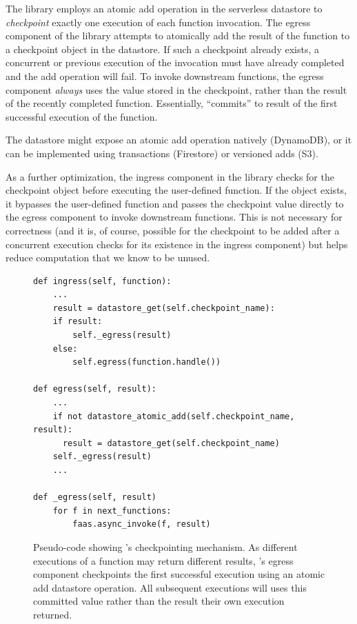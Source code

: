 The \name{} library employs an atomic add operation in the serverless datastore
to \emph{checkpoint} exactly one execution of each function invocation. The
egress component of the \name{} library attempts to atomically add the result of
the function to a checkpoint object in the datastore. If such a checkpoint
already exists, a concurrent or previous execution of the invocation must have
already completed and the add operation will fail. To invoke downstream
functions, the egress component \emph{always} uses the value stored in the
checkpoint, rather than the result of the recently completed function.
Essentially, \name{} ``commits'' to result of the first successful execution of
the function.

The datastore might expose an atomic add operation natively (DynamoDB), or it
can be implemented using transactions (Firestore) or versioned adds (S3).

As a further optimization, the ingress component in the \name{} library checks
for the checkpoint object before executing the user-defined function. If the
object exists, it bypasses the user-defined function and passes the checkpoint
value directly to the egress component to invoke downstream functions. This is
not necessary for correctness (and it is, of course, possible for the checkpoint
to be added after a concurrent execution checks for its existence in the ingress
component) but helps reduce computation that we know to be unused.

\begin{figure}
\begin{verbatim}
def ingress(self, function):
    ...
    result = datastore_get(self.checkpoint_name):
    if result:
        self._egress(result)
    else:
        self.egress(function.handle())

def egress(self, result):
    ...
    if not datastore_atomic_add(self.checkpoint_name, result):
      result = datastore_get(self.checkpoint_name)
    self._egress(result)
    ...

def _egress(self, result)
    for f in next_functions:
        faas.async_invoke(f, result)
\end{verbatim}
\label{fig:design:checkpoint}
\caption{Pseudo-code showing \name{}'s checkpointing mechanism. As different
executions of a function may return different results, \name{}'s egress
component checkpoints the first successful execution using an atomic add
datastore operation. All subsequent executions will uses this committed value
rather than the result their own execution returned.}
\end{figure}

